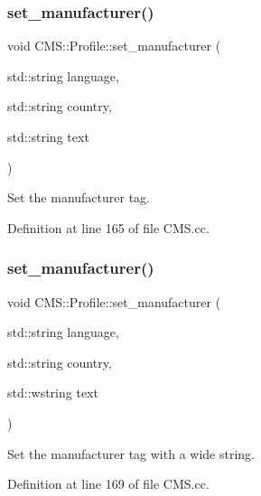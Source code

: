 \subsubsection{\texorpdfstring{set\+\_\+manufacturer()}{set\_manufacturer()}\hspace{0.1cm}{\footnotesize\ttfamily [1/2]}}
{\footnotesize\ttfamily void C\+M\+S\+::\+Profile\+::set\+\_\+manufacturer (\begin{DoxyParamCaption}\item[{std\+::string}]{language,  }\item[{std\+::string}]{country,  }\item[{std\+::string}]{text }\end{DoxyParamCaption})}



Set the manufacturer tag. 



Definition at line 165 of file C\+M\+S.\+cc.

\mbox{\label{class_c_m_s_1_1_profile_a2a10ecfe0b67cb72be7d0afa9717dcee}} 
\subsubsection{\texorpdfstring{set\+\_\+manufacturer()}{set\_manufacturer()}\hspace{0.1cm}{\footnotesize\ttfamily [2/2]}}
{\footnotesize\ttfamily void C\+M\+S\+::\+Profile\+::set\+\_\+manufacturer (\begin{DoxyParamCaption}\item[{std\+::string}]{language,  }\item[{std\+::string}]{country,  }\item[{std\+::wstring}]{text }\end{DoxyParamCaption})}



Set the manufacturer tag with a wide string. 



Definition at line 169 of file C\+M\+S.\+cc.

\mbox{\label{class_c_m_s_1_1_profile_a3eac2ae4b39f826f173ea3d6d6fbebd0}} 
